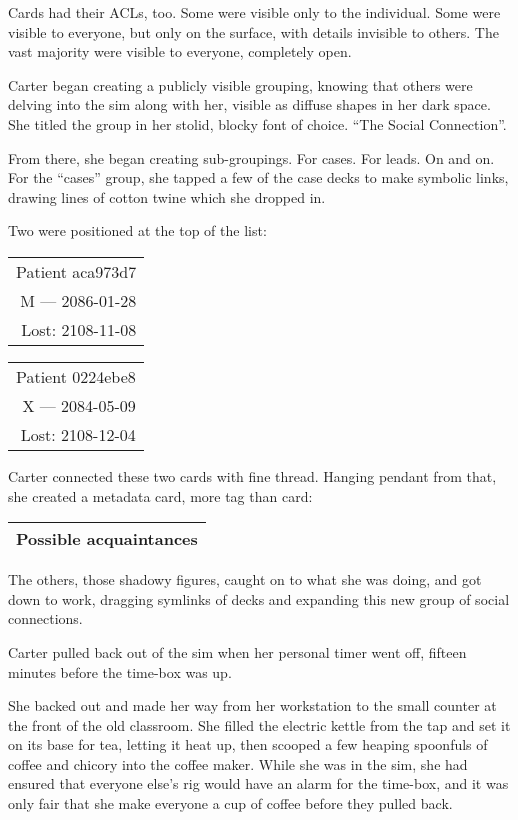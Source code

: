 Cards had their ACLs, too. Some were visible only to the individual. Some were visible to everyone, but only on the surface, with details invisible to others. The vast majority were visible to everyone, completely open.

Carter began creating a publicly visible grouping, knowing that others were delving into the sim along with her, visible as diffuse shapes in her dark space. She titled the group in her stolid, blocky font of choice. ``The Social Connection''.

From there, she began creating sub-groupings. For cases. For leads. On and on. For the ``cases'' group, she tapped a few of the case decks to make symbolic links, drawing lines of cotton twine which she dropped in.

Two were positioned at the top of the list:

\begin{longtable}[]{@{}r@{}}
\toprule
\endhead
Patient aca973d7\tabularnewline
M --- 2086-01-28\tabularnewline
Lost: 2108-11-08\tabularnewline
\bottomrule
\end{longtable}

\begin{longtable}[]{@{}r@{}}
\toprule
\endhead
Patient 0224ebe8\tabularnewline
X --- 2084-05-09\tabularnewline
Lost: 2108-12-04\tabularnewline
\bottomrule
\end{longtable}

Carter connected these two cards with fine thread. Hanging pendant from that, she created a metadata card, more tag than card:

\begin{longtable}[]{@{}l@{}}
\toprule
\endhead
Possible acquaintances\tabularnewline
\bottomrule
\end{longtable}

The others, those shadowy figures, caught on to what she was doing, and got down to work, dragging symlinks of decks and expanding this new group of social connections.

Carter pulled back out of the sim when her personal timer went off, fifteen minutes before the time-box was up.

She backed out and made her way from her workstation to the small counter at the front of the old classroom. She filled the electric kettle from the tap and set it on its base for tea, letting it heat up, then scooped a few heaping spoonfuls of coffee and chicory into the coffee maker. While she was in the sim, she had ensured that everyone else's rig would have an alarm for the time-box, and it was only fair that she make everyone a cup of coffee before they pulled back.

